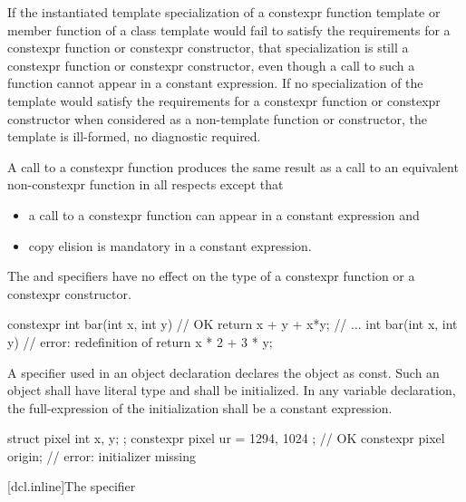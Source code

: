 \pnum
If the instantiated template specialization of a constexpr function
template
or member function of a class template
would fail to satisfy the requirements for a constexpr
function or constexpr constructor,
that specialization is still a constexpr function or constexpr
constructor, even though a call to such a function cannot appear in a constant
expression. If no specialization of the template would satisfy the
requirements for a constexpr function or constexpr constructor
when considered as a non-template function or constructor, the template is
ill-formed, no diagnostic required.

\pnum
A call to a constexpr function produces the same result as a call to an equivalent
non-constexpr function in all respects except that
\begin{itemize}
\item
a call to a constexpr
function can appear in a constant expression and
\item
copy elision is mandatory in a constant expression.
\end{itemize}

\pnum
The  and  specifiers have no
effect on the type of a constexpr function or a constexpr constructor.
\begin{example}
\begin{codeblock}
constexpr int bar(int x, int y)         // OK
    { return x + y + x*y; }
// ...
int bar(int x, int y)                   // error: redefinition of 
    { return x * 2 + 3 * y; }
\end{codeblock}
\end{example}

\pnum
A  specifier used in an object declaration
declares the object as const.
Such an object
shall have literal type and
shall be initialized.
In any  variable declaration,
the full-expression of the initialization
shall be a constant expression.
\begin{example}
\begin{codeblock}
struct pixel {
  int x, y;
};
constexpr pixel ur = { 1294, 1024 };    // OK
constexpr pixel origin;                 // error: initializer missing
\end{codeblock}
\end{example}

[dcl.inline]{The  specifier}%


